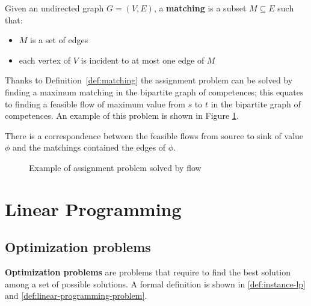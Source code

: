 \documentclass[english]{article}
\begin{document}
\bigskip
\begin{definition}[Matching]
  Given an undirected graph \(G = \left( V, E \right)\), a \textbf{matching} is a subset \(M \subseteq E\) such that:
  \begin{itemize}
    \item \(M\) is a set of edges
    \item each vertex of \(V\) is incident to at most one edge of \(M\)
  \end{itemize}
  \label{def:matching}
\end{definition}

Thanks to Definition~\ref{def:matching} the assignment problem can be solved by finding a maximum matching in the bipartite graph of competences;
this equates to finding a feasible flow of maximum value from \(s\) to \(t\) in the bipartite graph of competences.
An example of this problem is shown in Figure \ref{fig:assignment-flow-example}.

There is a correspondence between the feasible flows from source to sink of value \(\phi\) and the matchings contained the edges of \(\phi\).

\begin{figure}[htbp]
  \bigskip
  \centering
  \caption{Example of assignment problem solved by flow}
  \label{fig:assignment-flow-example}
  \bigskip
\end{figure}

\clearpage

\section{Linear Programming}
\label{sec:linear-programming}

\subsection{Optimization problems}

\textbf{Optimization problems} are problems that require to find the best solution among a set of possible solutions.
A formal definition is shown in \ref{def:instance-lp} and \ref{def:linear-programming-problem}.
\end{document}
